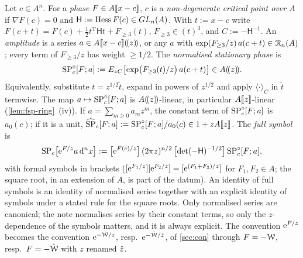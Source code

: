 \begin{defn}
\label{def:fsp-wick}
Let $c\in A^n$. For a \emph{phase} $F\in A[\![ x-c ]\!]$, $c$ is a \emph{non-degenerate critical point over $A$} if $\nabla F(c)=0$ and $\mathsf H:=\operatorname{Hess} F(c)\in GL_n(A)$. With $t:=x-c$ write $F(c+t)=F(c)+\frac12t^{\mathrm T}\mathsf Ht+F_{\geq3}(t)$, $F_{\geq3}\in(t)^3$, and $C:=-\mathsf H^{-1}$. An \emph{amplitude} is a series $a\in A[\![ x-c ]\!](\!(z)\!)$, or any $a$ with $\exp(F_{\geq3}/z)\,a(c+t)\in\mathcal{R}_n(A)$; every term of $F_{\geq3}/z$ has weight $\geq1/2$. The \emph{normalised stationary phase} is
\[
\mathrm{SP}^{\circ}_c[F;a]:=E_{zC}\bigl[\exp\bigl(F_{\geq3}(t)/z\bigr)\,a(c+t)\bigr]\in A(\!(z)\!).
\]
Equivalently, substitute $t=z^{1/2}\tilde t$, expand in powers of $z^{1/2}$ and apply $\langle\cdot\rangle_C$ in $\tilde t$ termwise. The map $a\mapsto\mathrm{SP}^{\circ}_c[F;a]$ is $A(\!(z)\!)$-linear, in particular $A[\![ z ]\!]$-linear (\cref{lem:fsp-ring}~(iv)). If $a=\sum_{m\geq0}a_mz^m$, the constant term of $\mathrm{SP}^{\circ}_c[F;a]$ is $a_0(c)$; if it is a unit, $\widehat{\mathrm{SP}}_c[F;a]:=\mathrm{SP}^{\circ}_c[F;a]/a_0(c)\in1+zA[\![ z ]\!]$. The \emph{full symbol} is
\[
\mathrm{SP}_c\bigl[\mathrm{e}^{F/z}a\,\mathrm{d}^nx\bigr]:=\bigl[\mathrm{e}^{F(c)/z}\bigr]\,(2\pi z)^{n/2}\,\bigl[\det(-\mathsf H)^{-1/2}\bigr]\,\mathrm{SP}^{\circ}_c[F;a],
\]
with formal symbols in brackets ($[\mathrm{e}^{F_1/z}][\mathrm{e}^{F_2/z}]=[\mathrm{e}^{(F_1+F_2)/z}]$ for $F_1,F_2\in A$; the square root, in an extension of $A$, is part of the datum). An identity of full symbols is an identity of normalised series together with an explicit identity of symbols under a stated rule for the square roots. Only normalised series are canonical; the note normalises series by their constant terms, so only the $z$-dependence of the symbols matters, and it is always explicit. The convention $\mathrm{e}^{F/z}$ becomes the convention $\mathrm{e}^{-\mathcal{W}/z}$, resp.\ $\mathrm{e}^{-\hat{\mathcal{W}}/\hat{z}}$, of \cref{sec:con} through $F=-\mathcal{W}$, resp.\ $F=-\hat{\mathcal{W}}$ with $z$ renamed $\hat{z}$.
\end{defn}


